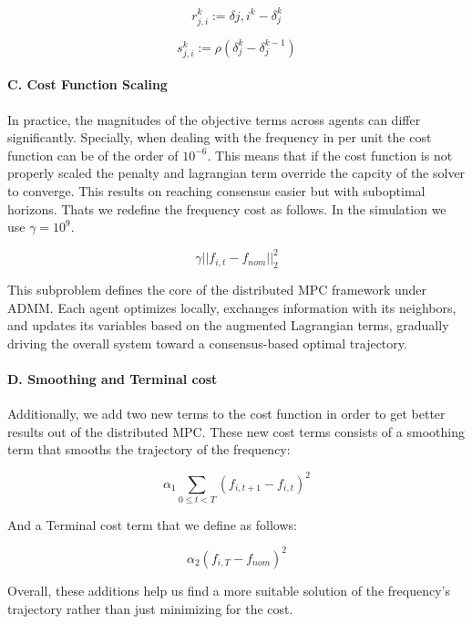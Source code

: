 \documentclass{article}
\begin{document}
\[
r_{j,i}^k := \delta{j,i}^k - \delta_j^k
\]

\[
s_{j,i}^k := \rho \left( \delta_j^k - \delta_j^{k-1} \right)
\]

\paragraph{C. Cost Function Scaling} 
In practice, the magnitudes of the objective terms across agents can differ significantly. Specially, when dealing with the frequency in per unit the cost function can be of the order of $10^{-6}$. This means that if the cost function is not properly scaled the penalty and lagrangian term override the capcity of the solver to converge. This results on reaching consensus easier but with suboptimal horizons. Thats we redefine the frequency cost as follows. In the simulation we use $\gamma = 10^9$.

\begin{equation}
    \gamma ||f_{i,t} - f_{nom}||_2^2
\end{equation}

This subproblem defines the core of the distributed MPC framework under ADMM. Each agent optimizes locally, exchanges information with its neighbors, and updates its variables based on the augmented Lagrangian terms, gradually driving the overall system toward a consensus-based optimal trajectory.

\paragraph{D. Smoothing and Terminal cost} 

Additionally, we add two new terms to the cost function in order to get better results out of the distributed MPC. These new cost terms consists of a smoothing term that smooths the trajectory of the frequency:

\begin{equation}
    \alpha_1 \sum_{0 \leq t < T}(f_{i,t+1} - f_{i,t})^2 
\end{equation}

And a Terminal cost term that we define as follows:

\begin{equation}
    \alpha_2 (f_{i,T} - f_{nom})^2 
\end{equation}

Overall, these additions help us find a more suitable solution of the frequency's trajectory rather than just minimizing for the cost.
\end{document}
